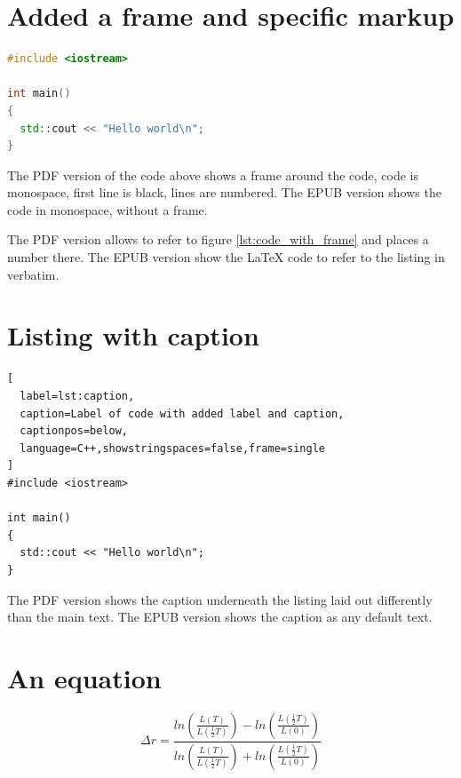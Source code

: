 \documentclass[ebook,12pt,oneside,openany]{memoir}
\begin{document}
\section{Added a frame and specific markup}

\begin{lstlisting}[language=C++,showstringspaces=false,frame=single,label=lst:code_with_frame]
#include <iostream>

int main()
{
  std::cout << "Hello world\n";
}
\end{lstlisting}

The PDF version of the code above shows a frame around the code, code is monospace, first line is black, lines are numbered.
The EPUB version shows the code in monospace, without a frame.

The PDF version allows to refer to figure \ref{lst:code_with_frame} and places a number there.
The EPUB version show the LaTeX code to refer to the listing in verbatim.

\section{Listing with caption}

\begin{lstlisting}[
  label=lst:caption,
  caption=Label of code with added label and caption,
  captionpos=below,
  language=C++,showstringspaces=false,frame=single
]
#include <iostream>

int main()
{
  std::cout << "Hello world\n";
}
\end{lstlisting}

The PDF version shows the caption underneath the listing laid out differently than the main text.
The EPUB version shows the caption as any default text.

\section{An equation}

\begin{equation}
  \Delta r=\frac{ln\left(\frac{L(T)}{L(\frac{1}{2}T)}\right)-ln\left(\frac{L(\frac{1}{2}T)}{L(0)}\right)}{ln\left(\frac{L(T)}{L(\frac{1}{2}T)}\right)+ln\left(\frac{L(\frac{1}{2}T)}{L(0)}\right)}
  \label{eq:delta_r}
\end{equation}
\end{document}
